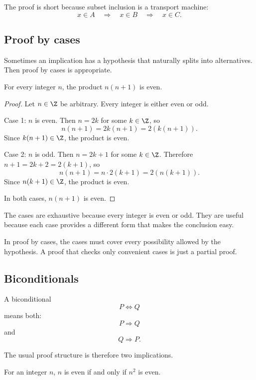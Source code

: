 The proof is short because subset inclusion is a transport machine:
\[
x\in A\quad\Rightarrow\quad x\in B\quad\Rightarrow\quad x\in C.
\]

\subsection{Proof by cases}

Sometimes an implication has a hypothesis that naturally splits into alternatives. Then proof by cases is appropriate.

\begin{theorem}
For every integer $n$, the product $n(n+1)$ is even.
\end{theorem}

\begin{proof}
Let $n\in\Z$ be arbitrary. Every integer is either even or odd.

Case 1: $n$ is even. Then $n=2k$ for some $k\in\Z$, so
\[
n(n+1)=2k(n+1)=2(k(n+1)).
\]
Since $k(n+1)\in\Z$, the product is even.

Case 2: $n$ is odd. Then $n=2k+1$ for some $k\in\Z$. Therefore $n+1=2k+2=2(k+1)$, so
\[
n(n+1)=n\cdot2(k+1)=2(n(k+1)).
\]
Since $n(k+1)\in\Z$, the product is even.

In both cases, $n(n+1)$ is even.
\end{proof}

The cases are exhaustive because every integer is even or odd. They are useful because each case provides a different form that makes the conclusion easy.

\begin{trapbox}
In proof by cases, the cases must cover every possibility allowed by the hypothesis. A proof that checks only convenient cases is just a partial proof.
\end{trapbox}

\subsection{Biconditionals}

A biconditional
\[
P\Longleftrightarrow Q
\]
means both:
\[
P\Rightarrow Q
\]
and
\[
Q\Rightarrow P.
\]

The usual proof structure is therefore two implications.

\begin{theorem}
For an integer $n$, $n$ is even if and only if $n^2$ is even.
\end{theorem}

